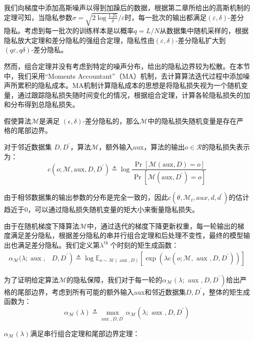 我们向梯度中添加高斯噪声以得到加躁后的数据，根据第二章所给出的高斯机制的定理可知，当隐私参数$\sigma=\sqrt{2 \log \frac{1.25}{\delta}} / \varepsilon$时，每一批次的输出都满足$(\varepsilon, \delta)$-差分隐私。考虑到每一批次的训练样本是以概率$q=L / N$从数据集中随机采样的，根据隐私放大定理和差分隐私的强组合定理，隐私性由$(\varepsilon, \delta)$-差分隐私扩大到 $(q \varepsilon, q \delta)$-差分隐私。

然而，组合定理并没有考虑到特定的噪声分布，给出的隐私边界较为松散。在本节中，我们采用“Moments Accountant”（MA）机制，去计算算法迭代过程中添加噪声所累积的隐私成本。MA机制计算隐私成本的思想是将隐私损失视为一个随机变量，通过跟踪隐私损失随时间变化的情况，根据组合定理，计算各轮隐私损失的加和分布得到总隐私损失。

假使算法$\mathcal{M}$是满足 $(\epsilon, \delta)$-差分隐私的，那么$\mathcal{M}$中的隐私损失随机变量是存在严格的尾部边界。

对于邻近数据集 $D, D^{\prime}$，算法$\mathcal{M}$，额外输入aux，算法的输出$o \in \mathcal{R}$的隐私损失表示为：
$$
c\left(o ; \mathcal{M}, \mathrm{aux}, D, D^{\prime}\right) \triangleq \log \frac{\operatorname{Pr}[\mathcal{M}(\mathrm{aux}, D)=o]}{\operatorname{Pr}\left[\mathcal{M}\left(\mathrm{aux}, D^{\prime}\right)=o\right]}
$$

由于相邻数据集的输出参数的分布是完全一致的，因此$c\left(\theta, \mathcal{M}_{t}, aux, d, d^{\prime}\right)$的估计趋近于0，可以通过隐私损失随机变量的矩大小来衡量隐私损失。

由于在随机梯度下降算法$\mathcal{M}$中，通过迭代的梯度下降更新权重，每一轮输出的梯度满足差分隐私，根据差分隐私的串并行组合定理和后处理不变性，最终的模型输出也满足差分隐私。我们定义第$\lambda^{\text {th }}$个时刻的矩生成函数：
$$
\begin{aligned}
\alpha_{\mathcal{M}}(\lambda ; \operatorname{aux},&\left.D, D^{\prime}\right) \triangleq\log \mathbb{E}_{o \sim \mathcal{M}(\operatorname{aux}, D)}\left[\exp \left(\lambda c\left(o ; \mathcal{M}, \text { aux }, D, D^{\prime}\right)\right)\right]
\end{aligned}
$$

为了证明给定算法$\mathcal{M}$的隐私保障，我们对于每一轮的$\alpha_{\mathcal{M}}\left(\lambda ;\right.$ aux $\left., D, D^{\prime}\right)$给出严格的尾部边界，考虑到所有可能的额外输入aux和邻近数据集$D, D^{\prime}$，整体的矩生成函数为：
$$
\alpha_{\mathcal{M}}(\lambda) \triangleq \max _{\text {aux }, D, D^{\prime}} \alpha_{\mathcal{M}}\left(\lambda ; \text { aux }, D, D^{\prime}\right)
$$

$\alpha_{\mathcal{M}}(\lambda)$满足串行组合定理和尾部边界定理：

